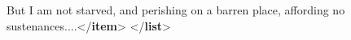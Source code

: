 \documentclass[11pt,twoside]{article}\makeatletter
\begin{document}
\begin{shaded}
\hspace*{6pt}\hspace*{6pt}But I am not starved, and perishing on a barren place,\mbox{}\newline 
\hspace*{6pt}\hspace*{6pt}\hspace*{6pt}\hspace*{6pt}\hspace*{6pt}\hspace*{6pt} affording no sustenances....{</\textbf{item}>}\mbox{}\newline 
\hspace*{6pt}\mbox{}\newline 
{}\mbox{}\newline 
{</\textbf{list}>}\end{shaded}\egroup\par \par
\end{document}
